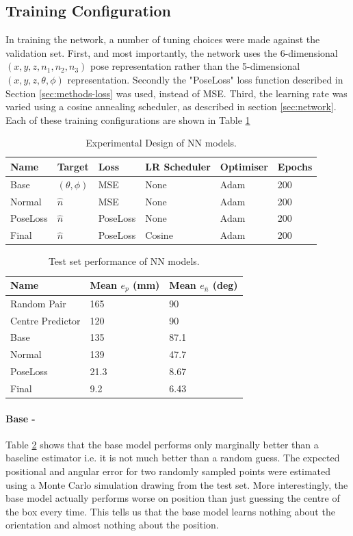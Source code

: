 \subsection{Training Configuration}
In training the network, a number of tuning choices were made against the validation set. First, and most importantly, the network uses the 6-dimensional $(x,y,z,n_1,n_2,n_3)$ pose representation rather than the 5-dimensional $(x,y,z,\theta,\phi)$ representation. Secondly the "PoseLoss" loss function described in Section \ref{sec:methods-loss} was used, instead of MSE. Third, the learning rate was varied using a cosine annealing scheduler, as described in section \ref{sec:network}. Each of these training configurations are shown in  Table \ref{tab:training_config} 
\begin{table}
  \centering
  \begin{tabular}{llllll}
    \toprule
    Name & Target & Loss & LR Scheduler & Optimiser & Epochs\\
    \midrule
    Base & $(\theta,\phi)$ & MSE & None & Adam & 200  \\
    Normal & $\hat{n}$ & MSE & None & Adam & 200\\
    PoseLoss & $\hat{n}$ & PoseLoss & None & Adam & 200 \\
    Final & $\hat{n}$ & PoseLoss & Cosine & Adam & 200 \\
    \bottomrule
  \end{tabular}
  \caption{Experimental Design of NN models.}
  \label{tab:training_config}
\end{table}
\begin{table}
  \centering
  \begin{tabular}{lll}
    \toprule
    Name & Mean $e_p$ (mm) & Mean $e_{\hat{n}}$ (deg)  \\
    \midrule
    Random Pair & 165 & 90 \\
    Centre Predictor & 120 & 90 \\
    Base & 135 & 87.1  \\
    Normal & 139 & 47.7 \\
    PoseLoss & 21.3 & 8.67 \\
    Final & 9.2 & 6.43 \\
    \bottomrule
  \end{tabular}
  \caption{Test set performance of NN models.}
  \label{tab:nn_results}
\end{table}

\paragraph{Base -}Table \ref{tab:nn_results} shows that the base model performs only marginally better than a baseline estimator i.e. it is not much better than a random guess. The expected positional and angular error for two randomly sampled points were estimated using a Monte Carlo simulation drawing from the test set. More interestingly, the base model actually performs worse on position than just guessing the centre of the box every time. This tells us that the base model learns nothing about the orientation and almost nothing about the position.


